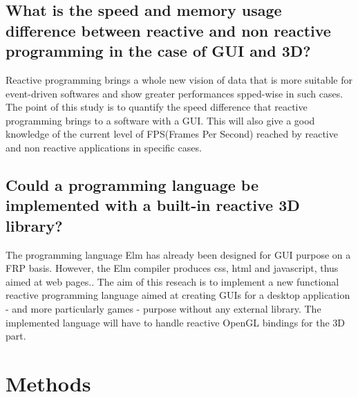 \documentclass[12pt,a4paper]{scrartcl}
\begin{document}
\subsection{What is the speed and memory usage difference between reactive and non reactive programming in the case of GUI and 3D?}
Reactive programming brings a whole new vision of data that is more suitable for event-driven softwares and show greater performances spped-wise in such cases.\cite{bainomugisha2013survey} 
The point of this study is to quantify the speed difference that reactive programming brings to a software with a GUI. This will also give a good knowledge of the current level of FPS(Frames Per Second) reached by reactive and non reactive applications in specific cases. 
\subsection{Could a programming language be implemented with a built-in reactive 3D library?}
The programming language Elm has already been designed for GUI purpose on a FRP basis. However, the Elm compiler produces css, html and javascript, thus aimed at web pages.\cite{czaplicki2012elm}. The aim of this reseach is to implement a new functional reactive programming language aimed at creating GUIs for a desktop application - and more particularly games - purpose without any external library. The implemented language will have to handle reactive OpenGL bindings for the 3D part.


\section{Methods}
\end{document}
